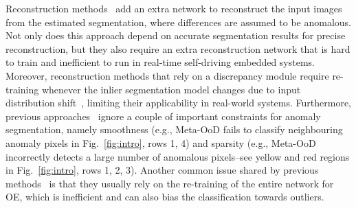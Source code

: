 \documentclass[runningheads]{llncs}
\begin{document}
Reconstruction methods~\cite{di2021pixel,xia2020synthesize} add an extra network to reconstruct the input images from the estimated segmentation, where differences are assumed to be anomalous. Not only does this approach depend on accurate segmentation results for precise reconstruction, but they also require an extra reconstruction network that is hard to train and inefficient to run in real-time self-driving embedded systems. 
Moreover, reconstruction methods that rely on a discrepancy 
module require re-training whenever the inlier segmentation model changes due to input distribution shift~\cite{di2021pixel}, limiting their applicability in real-world systems.
Furthermore, previous approaches~\cite{chan2021entropy,di2021pixel,bevandic2019simultaneous,lis2019detecting,jung2021standardized,grcic2021dense} ignore a couple of important constraints for anomaly segmentation, namely smoothness (e.g., Meta-OoD fails to classify neighbouring anomaly pixels in Fig.~\ref{fig:intro}, rows 1, 4) and sparsity (e.g., Meta-OoD incorrectly detects a large number of anomalous pixels--see yellow and red regions in Fig.~\ref{fig:intro}, rows 1, 2, 3).
Another common issue shared by previous methods~\cite{chan2021entropy,bevandic2019simultaneous,lis2019detecting} is that they usually rely on the re-training of the entire network for OE, which is inefficient and can also bias the classification towards outliers.
\end{document}
